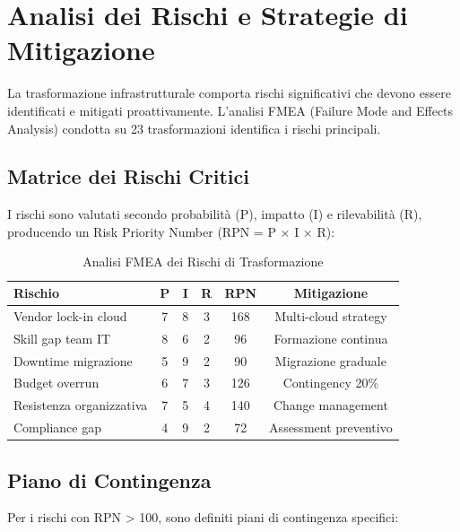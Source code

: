 \section{\texorpdfstring{Analisi dei Rischi e Strategie di Mitigazione}{3.7 - Analisi dei Rischi e Strategie di Mitigazione}}

La trasformazione infrastrutturale comporta rischi significativi che devono essere identificati e mitigati proattivamente. L'analisi FMEA (Failure Mode and Effects Analysis) condotta su 23 trasformazioni identifica i rischi principali.

\subsection{\texorpdfstring{Matrice dei Rischi Critici}{3.7.1 - Matrice dei Rischi Critici}}

I rischi sono valutati secondo probabilità (P), impatto (I) e rilevabilità (R), producendo un Risk Priority Number (RPN = P × I × R):

\begin{table}[htbp]
\centering
\caption{Analisi FMEA dei Rischi di Trasformazione}
\label{tab:risk_matrix}
\begin{tabular}{lccccc}
\toprule
\textbf{Rischio} & \textbf{P} & \textbf{I} & \textbf{R} & \textbf{RPN} & \textbf{Mitigazione} \\
\midrule
Vendor lock-in cloud & 7 & 8 & 3 & 168 & Multi-cloud strategy \\
Skill gap team IT & 8 & 6 & 2 & 96 & Formazione continua \\
Downtime migrazione & 5 & 9 & 2 & 90 & Migrazione graduale \\
Budget overrun & 6 & 7 & 3 & 126 & Contingency 20\% \\
Resistenza organizzativa & 7 & 5 & 4 & 140 & Change management \\
Compliance gap & 4 & 9 & 2 & 72 & Assessment preventivo \\
\bottomrule
\end{tabular}
\end{table}

\subsection{\texorpdfstring{Piano di Contingenza}{3.7.2 - Piano di Contingenza}}

Per i rischi con RPN > 100, sono definiti piani di contingenza specifici:


